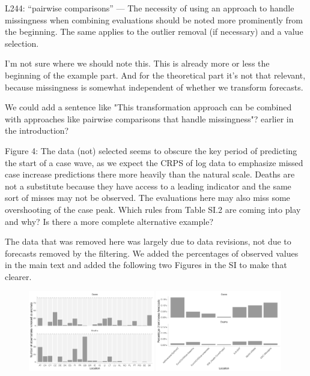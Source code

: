 \documentclass{article}
\newcommand{\red}{\color{red}}
\newcommand{\black}{\color{black}}
\begin{document}
L244: “pairwise comparisons” — The necessity of using an approach to handle missingness when combining evaluations should be noted more prominently from the beginning. The same applies to the outlier removal (if necessary) and a value selection.

\black
I'm not sure where we should note this. This is already more or less the beginning of the example part. 
And for the theoretical part it's not that relevant, because missingness is somewhat independent of whether we transform forecasts. 

We could add a sentence like "This transformation approach can be combined with approaches like pairwise comparisons that handle missingness"? earlier in the introduction? 


\red
Figure 4: The data (not) selected seems to obscure the key period of predicting the start of a case wave, as we expect the CRPS of log data to emphasize missed case increase predictions there more heavily than the natural scale. Deaths are not a substitute because they have access to a leading indicator and the same sort of misses may not be observed. The evaluations here may also miss some overshooting of the case peak. Which rules from Table SI.2 are coming into play and why? Is there a more complete alternative example?

\black
The data that was removed here was largely due to data revisions, not due to forecasts removed by the filtering. 
We added the percentages of observed values in the main text and added the following two Figures in the SI to make that clearer. 

\begin{figure}[h!]
    \centering
    \includegraphics[width=0.49\textwidth]{output/figures/number-anomalies.png}
     \includegraphics[width=0.49\textwidth]{output/figures/erroneous-forecasts.png}
     \caption{}
    \label{fig:number-anomalies}
\end{figure}
\end{document}
